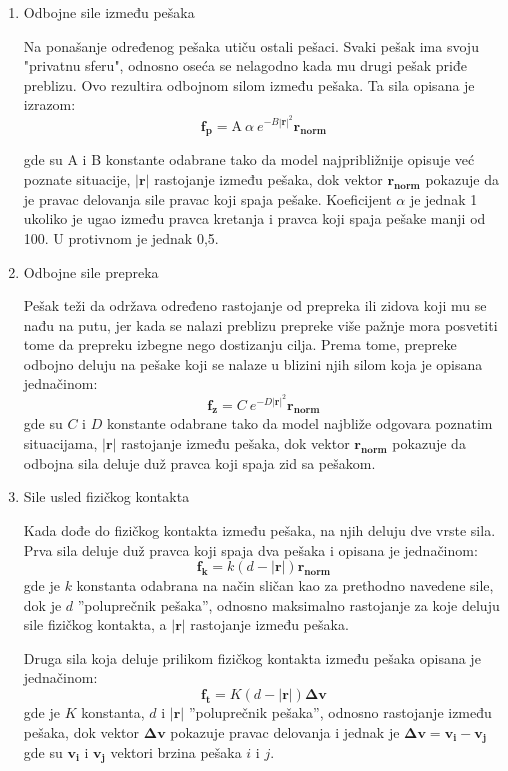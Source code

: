 \documentclass[12pt]{article}
\begin{document}
\begin{enumerate}

\item Odbojne sile između pešaka 

Na ponašanje određenog pešaka utiču ostali pešaci. Svaki pešak ima svoju "privatnu sferu", odnosno oseća se nelagodno kada mu drugi pešak priđe preblizu. Ovo rezultira odbojnom silom između pešaka. Ta sila opisana je izrazom:
$$
\mathbf{f_{p}}=\mathrm{A}\ \alpha\ e^{-B|\mathbf r|^2}\mathbf{r_{norm}}
$$

gde su A i B konstante odabrane tako da model najpribližnije opisuje već poznate situacije, $|\mathbf r|$ rastojanje između pešaka, dok vektor $\mathbf{r_{norm}}$ pokazuje da je pravac delovanja sile pravac koji spaja pešake. Koeficijent $\alpha$ je jednak 1 ukoliko je ugao između pravca kretanja i pravca koji spaja pešake manji od 100\degree. U protivnom je jednak 0,5.


\item Odbojne sile prepreka

Pešak teži da održava određeno rastojanje od prepreka ili zidova koji mu se nađu na putu, jer kada se nalazi preblizu prepreke više pažnje mora posvetiti tome da prepreku izbegne nego dostizanju cilja. Prema tome, prepreke odbojno deluju na pešake koji se nalaze u blizini njih silom koja je opisana jednačinom:
$$
\mathbf{f_{z}}=C\ e^{-D|\mathbf r|^2}\mathbf{r_{norm}}
$$
gde su $C$ i $D$ konstante odabrane tako da model najbliže odgovara poznatim situacijama, $|\mathbf r|$ rastojanje između pešaka, dok vektor $\mathbf{r_{norm}}$ pokazuje da odbojna sila deluje duž pravca koji spaja zid sa pešakom. 

\item Sile usled fizičkog kontakta

Kada dođe do fizičkog kontakta između pešaka, na njih deluju dve vrste sila. Prva sila deluje duž pravca koji spaja dva pešaka i opisana je jednačinom:
$$
\mathbf{f_k}=k(d-|\mathbf r|)\mathbf{r_{norm}}
$$
gde je $k$ konstanta odabrana na način sličan kao za prethodno navedene sile, dok je $d$ ''poluprečnik pešaka'', odnosno maksimalno rastojanje za koje deluju sile fizičkog kontakta, a $|\mathbf r|$ rastojanje između pešaka.

Druga sila koja deluje prilikom fizičkog kontakta između pešaka opisana je jednačinom:
$$
\mathbf{f_t}=K(d-|\mathbf r|)\mathbf{\Delta v}
$$
gde je $K$ konstanta, $d$ i $|\mathbf r|$ ''poluprečnik pešaka'', odnosno rastojanje između pešaka, dok vektor $\mathbf{\Delta v}$ pokazuje pravac delovanja i jednak je $\mathbf{\Delta v}=\mathbf{v_i}-\mathbf{v_j}$ gde su $\mathbf{v_i}$ i $\mathbf{v_j}$ vektori brzina pešaka $i$ i $j$.
\end{enumerate}
\end{document}
